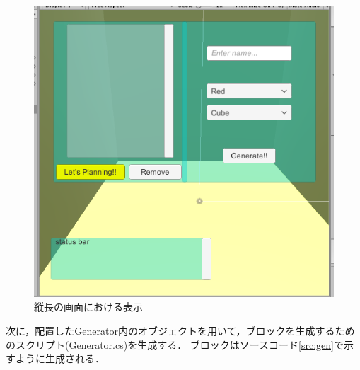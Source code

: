 \documentclass[12pt]{jarticle}
\begin{document}
\begin{figure}[!hbt]
  \begin{center}
    \includegraphics[scale=0.5]{images/BWP_Work6/anchor3.png}
  \end{center}
  \caption{縦長の画面における表示}
  \label{fig:an3}
\end{figure}

\clearpage

次に，配置したGenerator内のオブジェクトを用いて，ブロックを生成するためのスクリプト(Generator.cs)を生成する．
ブロックはソースコード\ref{src:gen}で示すように生成される．
\end{document}
